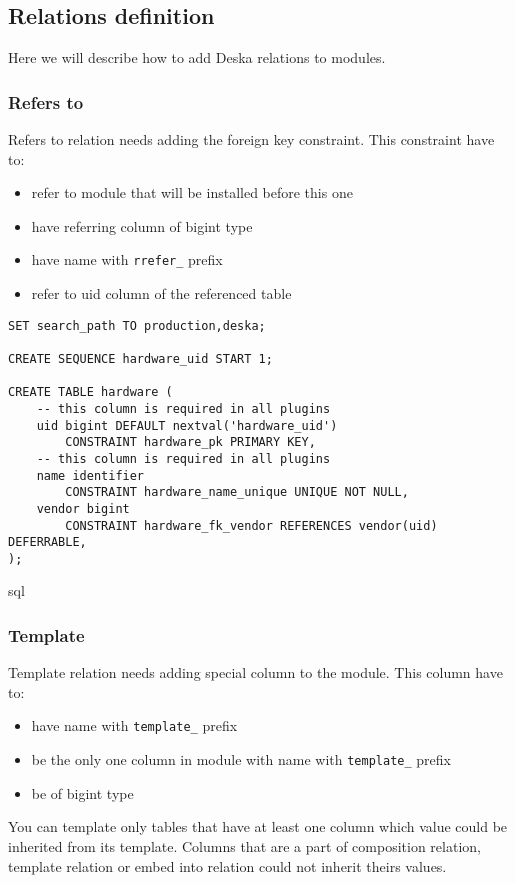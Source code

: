 \documentclass[deska]{subfiles}
\begin{document}
\subsection{Relations definition}
Here we will describe how to add Deska relations to modules.

\subsubsection{Refers to}
Refers to relation needs adding the foreign key constraint. This constraint have to:
\begin{itemize}
    \item refer to module that will be installed before this one
    \item have referring column of bigint type
    \item have name with {\tt rrefer\_} prefix
    \item refer to uid column of the referenced table
\end{itemize}

\begin{verbatim}
SET search_path TO production,deska;

CREATE SEQUENCE hardware_uid START 1;

CREATE TABLE hardware (
    -- this column is required in all plugins
    uid bigint DEFAULT nextval('hardware_uid')
        CONSTRAINT hardware_pk PRIMARY KEY,
    -- this column is required in all plugins
    name identifier
        CONSTRAINT hardware_name_unique UNIQUE NOT NULL,
    vendor bigint 
        CONSTRAINT hardware_fk_vendor REFERENCES vendor(uid) DEFERRABLE,
);
\end{verbatim}{sql}

\subsubsection{Template}
Template relation needs adding special column to the module. This column have to:
\begin{itemize}
    \item have name with {\tt template\_} prefix
    \item be the only one column in module with name with {\tt template\_} prefix
    \item be of bigint type
\end{itemize}
You can template only tables that have at least one column which value could be inherited from its template. Columns that are a part of composition relation, template relation or embed into relation could not inherit theirs values.
\end{document}
